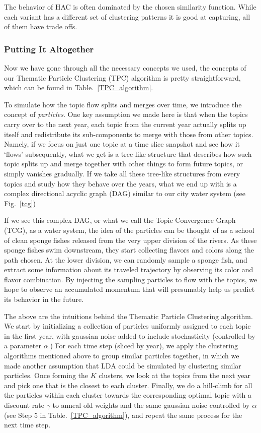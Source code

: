 \documentclass[conference]{IEEEtran}
\begin{document}
 The behavior of HAC is often dominated by the chosen similarity function. While each variant has a different set of clustering patterns it is good at capturing, all of them have trade offs. 

\subsubsection{Putting It Altogether}

Now we have gone through all the necessary concepts we used, the concepts of our Thematic Particle Clustering (TPC) algorithm is pretty straightforward, which can be found in Table.~\ref{TPC_algorithm}. 

To simulate how the topic flow splits and merges over time, we introduce the concept of \emph{particles}. One key assumption we made here is that when the topics carry over to the next year, each topic from the current year actually splits up itself and redistribute its sub-components to merge with those from other topics. Namely, if we focus on just one topic at a time slice snapshot and see how it `flows' subsequently, what we get is a tree-like structure that describes how such topic splits up and merge together with other things to form future topics, or simply vanishes gradually. If we take all these tree-like structures from every topics and study how they behave over the years, what we end up with is a complex directional acyclic graph (DAG) similar to our city water system (see Fig.~\ref{tcg})

If we see this complex DAG, or what we call the Topic Convergence Graph (TCG), as a water system, the idea of the particles can be thought of as a school of clean sponge fishes released from the very upper division of the rivers. As these sponge fishes swim downstream, they start collecting flavors and colors along the path chosen. At the lower division, we can randomly sample a sponge fish, and extract some information about its traveled trajectory by observing its color and flavor combination. By injecting the sampling particles to flow with the topics, we hope to observe an accumulated momentum that will presumably help us predict its behavior in the future.

The above are the intuitions behind the Thematic Particle Clustering algorithm. We start by initializing a collection of particles uniformly assigned to each topic in the first year, with gaussian noise added to include stochasticity (controlled by a parameter $\alpha$.) For each time step (sliced by year), we apply the clustering algorithms mentioned above to group similar particles together, in which we made another assumption that LDA could be simulated by clustering similar particles. Once forming the $K$ clusters, we look at the topics from the next year and pick one that is the closest to each cluster. Finally, we do a hill-climb for all the particles within each cluster towards the corresponding optimal topic with a discount rate $\gamma$ to anneal old weights and the same gaussian noise controlled by $\alpha$ (see Step 5 in Table.~\ref{TPC_algorithm}), and repeat the same process for the next time step.
\end{document}
